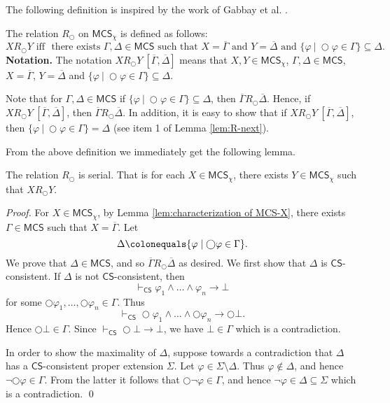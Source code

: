 \documentclass[envcountsect,envcountsame,oribibl,orivec]{llncs}
\newcommand{\lnext}{\bigcirc}
\newcommand{\CS}{\textsf{CS}}
\renewcommand{\phi}{\varphi}
\newcommand{\MCS}{\mathsf{MCS}}
\newcommand{\RO}[4]{#1 R_\lnext #2\ [#3, #4]}
\begin{document}
The following definition is inspired by the work of  Gabbay et al. \cite{Gabbay-Pnueli-Shelah-Stavi-1980}.

\begin{definition}
	The relation $R_\lnext$ on $\MCS_\chi$ is defined as follows:
	\[
	X R_\lnext Y 
	\text{ if{f} }
	\text{there exists $\Gamma, \Delta \in \MCS$ such that $X = \overline{\Gamma}$ and $Y = \overline{\Delta}$ and  }  \{ \phi \ |\  \lnext \phi \in \Gamma\} \subseteq \Delta.
	\]
	\textbf{Notation.}	The notation $\RO{X}{Y}{\overline{\Gamma}}{\overline{\Delta}}$ means that $X, Y \in \MCS_\chi$, $\Gamma, \Delta \in \MCS$, $X = \overline{\Gamma}$, $Y = \overline{\Delta}$ and $\{ \phi \ |\  \lnext \phi \in \Gamma\} \subseteq \Delta$. %
\end{definition}

Note that for $\Gamma, \Delta \in \MCS$ if $\{ \phi \ |\  \lnext \phi \in \Gamma\} \subseteq \Delta$, then $\overline{\Gamma} R_\lnext \overline{\Delta}$. Hence, if $\RO{X}{Y}{\overline{\Gamma}}{\overline{\Delta}}$, then $\overline{\Gamma} R_\lnext \overline{\Delta}$. In addition, it is easy to show that if $\RO{X}{Y}{\overline{\Gamma}}{\overline{\Delta}}$, then $\{ \phi \ |\  \lnext \phi \in \Gamma\} = \Delta$ (see item 1 of Lemma \ref{lem:R-next}).

From the above definition we immediately get the following lemma.

\begin{lemma}\label{lem:R-next is serial}
	The relation $R_\lnext$ is serial. 
	That is for each $X \in \MCS_\chi$, there exists $Y \in \MCS_\chi$ such that $X R_\lnext Y$.
\end{lemma}
\begin{proof}
	For $X \in \MCS_\chi$, by Lemma \ref{lem:characterization of MCS-X}, there exists $\Gamma \in \MCS$ such that $X =\overline{\Gamma}$. Let
	\[
	\Delta \colonequals \{ \phi \mid \lnext \phi \in \Gamma \}.
	\]
	We prove that $\Delta \in \MCS$, and so $\overline{\Gamma} R_\lnext \overline{\Delta}$ as desired. We first show that $\Delta$ is $\CS$-consistent. If $\Delta$ is not $\CS$-consistent, then
	\[
	\vdash_\CS \phi_1 \wedge \ldots \wedge \phi_n \rightarrow \bot
	\]
	for some $\lnext\phi_1, \ldots, \lnext\phi_n \in \Gamma$. Thus 
	\[
	\vdash_\CS \lnext\phi_1 \wedge \ldots \wedge \lnext\phi_n \rightarrow \lnext\bot.
	\]
	Hence $\lnext \bot \in \Gamma$. Since $\vdash_\CS \lnext \bot \to \bot$, we have %
	$\bot \in \Gamma$ which is a contradiction. 
	
	In order to show the maximality of $\Delta$, suppose towards a contradiction that $\Delta$ has a $\CS$-consistent proper extension $\Sigma$. Let $\phi \in \Sigma \setminus \Delta$. Thus $\phi \not \in \Delta$, and hence $\neg \lnext \phi \in \Gamma$. From the latter it follows that $\lnext \neg \phi \in \Gamma$, and hence $\neg \phi \in \Delta \subseteq \Sigma$ which is a contradiction.  
	\qed
\end{proof}
\end{document}
